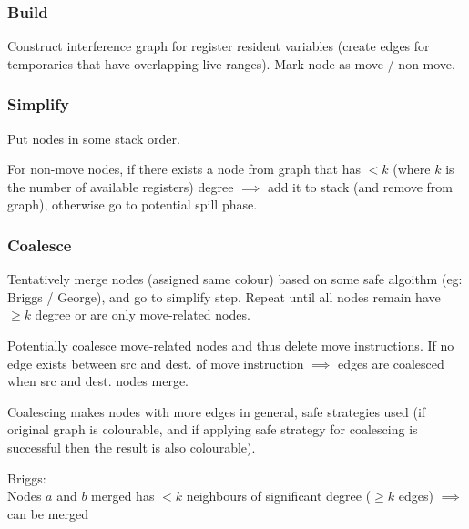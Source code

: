 \documentclass[8pt]{extarticle}
\begin{document}
\begin{multicols*}{2}

  \subsubsection{Build}
  Construct interference graph for register resident variables (create edges for temporaries that have overlapping live ranges). Mark node as move / non-move.

  \subsubsection{Simplify}
  Put nodes in some stack order.

  For non-move nodes, if there exists a node from graph that has $<k$ (where $k$ is the number of available registers) degree $\implies$ add it to stack (and remove from graph), otherwise go to potential spill phase.
  
  \subsubsection{Coalesce}
  Tentatively merge nodes (assigned same colour) based on some safe algoithm (eg: Briggs / George), and go to simplify step. Repeat until all nodes remain have $\geq k$ degree or are only move-related nodes.

  Potentially coalesce move-related nodes and thus delete move instructions. If no edge exists between src and dest. of move instruction $\implies$ edges are coalesced when src and dest. nodes merge.

  Coalescing makes nodes with more edges in general, safe strategies used (if original graph is colourable, and if applying safe strategy for coalescing is successful then the result is also colourable).

  Briggs:\\
  Nodes $a$ and $b$ merged has $<k$ neighbours of significant degree ($\geq k$ edges) $\implies$ can be merged


\end{multicols*}
\end{document}
